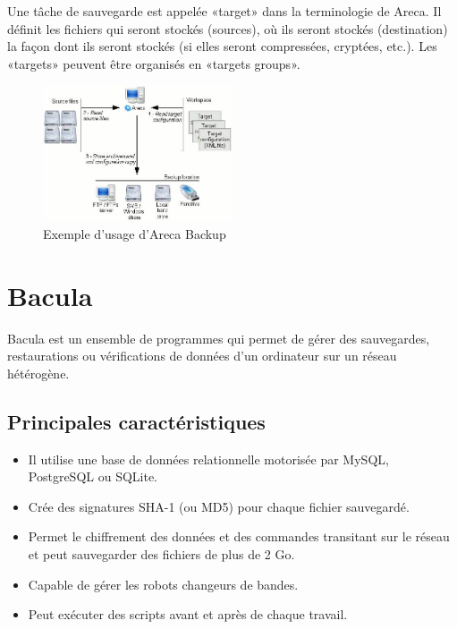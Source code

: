 \documentclass[a4paper,11pt]{report}
\begin{document}
Une tâche de sauvegarde est appelée «target» dans la terminologie de Areca. Il définit les fichiers qui seront stockés (sources), où ils seront stockés (destination) la façon dont ils seront stockés (si elles seront compressées, cryptées, etc.).
Les «targets» peuvent être organisés en «targets groups».

\begin{figure} [h]
\begin {center}
\includegraphics[width=0.5\textwidth]{areca_backup.jpg}
\caption{Exemple d'usage d'Areca Backup}
\end {center}
\end{figure}


\section{Bacula}
Bacula est un ensemble de programmes qui permet de gérer des sauvegardes, restaurations ou vérifications de données d'un ordinateur sur un réseau hétérogène.
\subsection{Principales caractéristiques}
\begin{itemize}
  \item Il utilise une base de données relationnelle motorisée par MySQL, PostgreSQL ou SQLite.
  \item Crée des signatures SHA-1 (ou MD5) pour chaque fichier sauvegardé.
  \item Permet le chiffrement des données et des commandes transitant sur le réseau et peut sauvegarder des fichiers de plus de 2 Go.
  \item Capable de gérer les robots changeurs de bandes.
  \item Peut exécuter des scripts avant et après de chaque travail.
\end{itemize}
\end{document}
